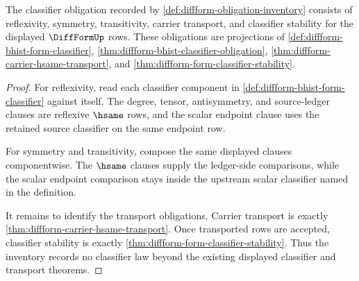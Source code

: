 \begin{theorem}
\label{thm:diffform-classifier-transport-obligation}
The classifier obligation recorded by
\autoref{def:diffform-obligation-inventory} consists of reflexivity, symmetry,
transitivity, carrier transport, and classifier stability for the displayed
$\DiffFormUp$ rows. These obligations are projections of
\autoref{def:diffform-bhist-form-classifier},
\autoref{thm:diffform-bhist-classifier-obligation},
\autoref{thm:diffform-carrier-hsame-transport}, and
\autoref{thm:diffform-form-classifier-stability}.
\end{theorem}
\begin{proof}
For reflexivity, read each classifier component in
\autoref{def:diffform-bhist-form-classifier} against itself. The degree,
tensor, antisymmetry, and source-ledger clauses are reflexive $\hsame$ rows,
and the scalar endpoint clause uses the retained source classifier on the
same endpoint row.

For symmetry and transitivity, compose the same displayed clauses
componentwise. The $\hsame$ clauses supply the ledger-side comparisons, while
the scalar endpoint comparison stays inside the upstream scalar classifier
named in the definition.

It remains to identify the transport obligations. Carrier transport is
exactly \autoref{thm:diffform-carrier-hsame-transport}. Once transported
rows are accepted, classifier stability is exactly
\autoref{thm:diffform-form-classifier-stability}. Thus the inventory records
no classifier law beyond the existing displayed classifier and transport
theorems.
\end{proof}

